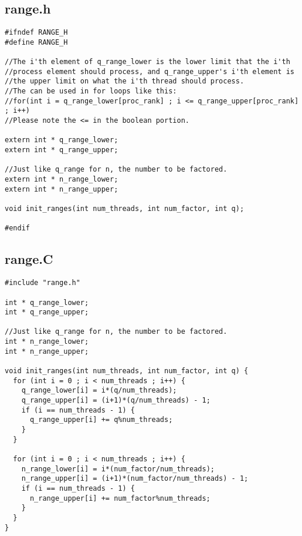 \documentclass[]{article}
\begin{document}
\subsection{range.h}
\begin{verbatim}
#ifndef RANGE_H
#define RANGE_H

//The i'th element of q_range_lower is the lower limit that the i'th
//process element should process, and q_range_upper's i'th element is
//the upper limit on what the i'th thread should process.
//The can be used in for loops like this:
//for(int i = q_range_lower[proc_rank] ; i <= q_range_upper[proc_rank] ; i++)
//Please note the <= in the boolean portion.

extern int * q_range_lower;
extern int * q_range_upper;

//Just like q_range for n, the number to be factored.
extern int * n_range_lower;
extern int * n_range_upper;

void init_ranges(int num_threads, int num_factor, int q);

#endif
\end{verbatim}

\subsection{range.C}
\begin{verbatim}
#include "range.h"

int * q_range_lower;
int * q_range_upper;

//Just like q_range for n, the number to be factored.
int * n_range_lower;
int * n_range_upper;

void init_ranges(int num_threads, int num_factor, int q) {
  for (int i = 0 ; i < num_threads ; i++) {
    q_range_lower[i] = i*(q/num_threads);
    q_range_upper[i] = (i+1)*(q/num_threads) - 1;
    if (i == num_threads - 1) {
      q_range_upper[i] += q%num_threads;
    }
  }

  for (int i = 0 ; i < num_threads ; i++) {
    n_range_lower[i] = i*(num_factor/num_threads);
    n_range_upper[i] = (i+1)*(num_factor/num_threads) - 1;
    if (i == num_threads - 1) {
      n_range_upper[i] += num_factor%num_threads;
    }
  }
}
\end{verbatim}
\end{document}
